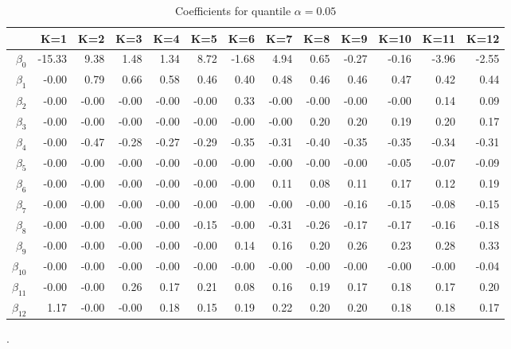 \begin{table}[ht]
\centering
\begin{tabular}{rrrrrrrrrrrrr}
  \hline
 & K=1 & K=2 & K=3 & K=4 & K=5 & K=6 & K=7 & K=8 & K=9 & K=10 & K=11 & K=12 \\ 
  \hline
$\beta_{0}$ & -15.33 & 9.38 & 1.48 & 1.34 & 8.72 & -1.68 & 4.94 & 0.65 & -0.27 & -0.16 & -3.96 & -2.55 \\ 
  $\beta_{1}$ & -0.00 & 0.79 & 0.66 & 0.58 & 0.46 & 0.40 & 0.48 & 0.46 & 0.46 & 0.47 & 0.42 & 0.44 \\ 
  $\beta_{2}$ & -0.00 & -0.00 & -0.00 & -0.00 & -0.00 & 0.33 & -0.00 & -0.00 & -0.00 & -0.00 & 0.14 & 0.09 \\ 
  $\beta_{3}$ & -0.00 & -0.00 & -0.00 & -0.00 & -0.00 & -0.00 & -0.00 & 0.20 & 0.20 & 0.19 & 0.20 & 0.17 \\ 
  $\beta_{4}$ & -0.00 & -0.47 & -0.28 & -0.27 & -0.29 & -0.35 & -0.31 & -0.40 & -0.35 & -0.35 & -0.34 & -0.31 \\ 
  $\beta_{5}$ & -0.00 & -0.00 & -0.00 & -0.00 & -0.00 & -0.00 & -0.00 & -0.00 & -0.00 & -0.05 & -0.07 & -0.09 \\ 
  $\beta_{6}$ & -0.00 & -0.00 & -0.00 & -0.00 & -0.00 & -0.00 & 0.11 & 0.08 & 0.11 & 0.17 & 0.12 & 0.19 \\ 
  $\beta_{7}$ & -0.00 & -0.00 & -0.00 & -0.00 & -0.00 & -0.00 & -0.00 & -0.00 & -0.16 & -0.15 & -0.08 & -0.15 \\ 
  $\beta_{8}$ & -0.00 & -0.00 & -0.00 & -0.00 & -0.15 & -0.00 & -0.31 & -0.26 & -0.17 & -0.17 & -0.16 & -0.18 \\ 
  $\beta_{9}$ & -0.00 & -0.00 & -0.00 & -0.00 & -0.00 & 0.14 & 0.16 & 0.20 & 0.26 & 0.23 & 0.28 & 0.33 \\ 
  $\beta_{10}$ & -0.00 & -0.00 & -0.00 & -0.00 & -0.00 & -0.00 & -0.00 & -0.00 & -0.00 & -0.00 & -0.00 & -0.04 \\ 
  $\beta_{11}$ & -0.00 & -0.00 & 0.26 & 0.17 & 0.21 & 0.08 & 0.16 & 0.19 & 0.17 & 0.18 & 0.17 & 0.20 \\ 
  $\beta_{12}$ & 1.17 & -0.00 & -0.00 & 0.18 & 0.15 & 0.19 & 0.22 & 0.20 & 0.20 & 0.18 & 0.18 & 0.17 \\ 
   \hline
\end{tabular}
\caption{Coefficients for quantile $\alpha = 0.05$}.
\end{table}
